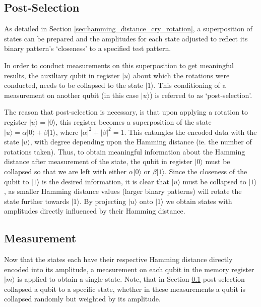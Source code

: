 \subsection{Post-Selection}
\label{sec:post_selection}
As detailed in Section \ref{sec:hamming_distance_cry_rotation}, a superposition of states can be prepared and the amplitudes for each state adjusted to reflect its binary pattern's `closeness' to a specified test pattern.

In order to conduct measurements on this superposition to get meaningful results, the auxiliary qubit in register $\vert u \rangle$ about which the rotations were conducted, needs to be collapsed to the state $\vert 1 \rangle$. This conditioning of a measurement on another qubit (in this case $\vert u \rangle$) is referred to as `post-selection'. 

The reason that post-selection is necessary, is that upon applying a rotation to register $\vert u \rangle = \vert 0 \rangle$, this register becomes a superposition of the state $\vert u \rangle = \alpha\vert 0 \rangle + \beta \vert 1 \rangle$, where $\left| \alpha \right|^2 + \left|\beta\right|^2 = 1$. This entangles the encoded data with the state $\vert u \rangle$, with degree depending upon the Hamming distance (ie. the number of rotations taken). Thus, to obtain meaningful information about the Hamming distance after measurement of the state, the qubit in register $\vert 0 \rangle$ must be collapsed so that we are left with either $\alpha \vert 0\rangle$ or $\beta \vert 1\rangle$. Since the closeness of the qubit to $\vert 1\rangle$ is the desired information, it is clear that $\vert u \rangle$ must be collapsed to $\vert 1\rangle$, as smaller Hamming distance values (larger binary patterns) will rotate the state further towards $\vert 1\rangle$. By projecting $\vert u \rangle$ onto $\vert 1 \rangle$ we obtain states with amplitudes directly influenced by their Hamming distance.

\subsection{Measurement}
\label{sec:measurement}
Now that the states each have their respective Hamming distance directly encoded into its amplitude, a measurement on each qubit in the memory register $\vert m \rangle$ is applied to obtain a single state. Note, that in Section \ref{sec:post_selection} post-selection collapsed a qubit to a specific state, whether in these measurements a qubit is collapsed randomly but weighted by its amplitude.

